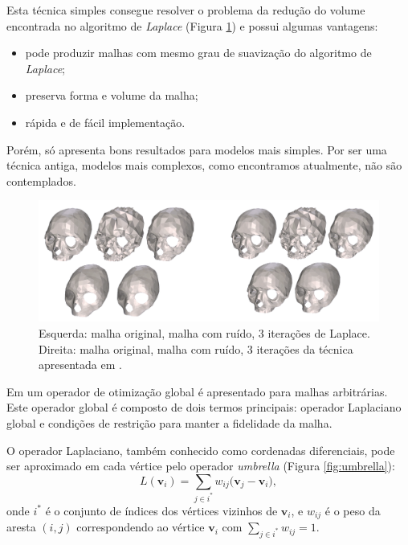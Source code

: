 Esta técnica simples consegue resolver o problema da redução do volume encontrada no algoritmo de \textit{Laplace} (Figura \ref{fig:vollmerExample}) e possui algumas vantagens:
\begin{itemize}
    \item pode produzir malhas com mesmo grau de suavização do algoritmo de \textit{Laplace};
    \item preserva forma e volume da malha;
    \item rápida e de fácil implementação.
\end{itemize}

Porém, só apresenta bons resultados para modelos mais simples. Por ser uma técnica antiga, modelos mais complexos, como encontramos atualmente, não são contemplados.

\begin{figure}[!h]
\captionsetup{width=\linewidth}
\centering
\includegraphics[width=\linewidth]{figuras/volmmerExample.png}
\caption{Esquerda: malha original, malha com ruído, 3 iterações de Laplace. Direita: malha original, malha com ruído, 3 iterações da técnica apresentada em \cite{vollmer1999improved}.}
\label{fig:vollmerExample}
\end{figure}

Em \cite{liu2007non} um operador de otimização global é apresentado para malhas arbitrárias. Este operador global é composto de dois termos principais: operador Laplaciano global e condições de restrição para manter a fidelidade da malha. 

O operador Laplaciano, também conhecido como cordenadas diferenciais, pode ser aproximado em cada vértice pelo operador \textit{umbrella} (Figura \ref{fig:umbrella}):
\begin{equation}
    L(\mathbf{v}_i) = \sum_{j\in i^*}{w_{ij}(\mathbf{v}_j - \mathbf{v}_i}),
\end{equation}
onde $i^*$ é o conjunto de índices dos vértices vizinhos de $\mathbf{v}_i$, e $w_{ij}$ é o peso da aresta $(i,j)$ correspondendo ao vértice $\mathbf{v}_i$ com $\sum_{j\in i^*}{w_{ij} = 1}.$

